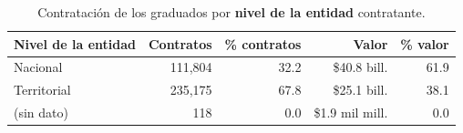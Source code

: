 \begin{table}[H]\centering\footnotesize
\caption{Contratación de los graduados por \textbf{nivel de la entidad} contratante.}\label{tab:secop_nivel}
\begin{tabular}{lrrrr}
\toprule
\rowcolor{ustaazul}\textbf{\color{white}Nivel de la entidad} & \textbf{\color{white}Contratos} & \textbf{\color{white}\% contratos} & \textbf{\color{white}Valor} & \textbf{\color{white}\% valor} \\
\midrule
Nacional & 111,804 & 32.2 & \$40.8 bill. & 61.9 \\
Territorial & 235,175 & 67.8 & \$25.1 bill. & 38.1 \\
(sin dato) & 118 & 0.0 & \$1.9 mil mill. & 0.0 \\
\bottomrule
\end{tabular}
\end{table}